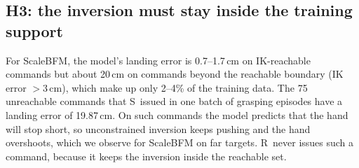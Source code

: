 \documentclass[conference]{IEEEtran}
\newcommand{\Sinv}{\textsc{S}}     %
\newcommand{\Rr}{\textsc{R}}       %
\begin{document}
\subsection{H3: the inversion must stay inside the training support}
For ScaleBFM, the model's landing error is 0.7--1.7\,cm on IK-reachable commands but about 20\,cm on commands beyond the reachable boundary (IK error $>3$\,cm), which make up only 2--4\% of the training data. The 75 unreachable commands that \Sinv\ issued in one batch of grasping episodes have a landing error of 19.87\,cm. On such commands the model predicts that the hand will stop short, so unconstrained inversion keeps pushing and the hand overshoots, which we observe for ScaleBFM on far targets. \Rr\ never issues such a command, because it keeps the inversion inside the reachable set.
\end{document}
